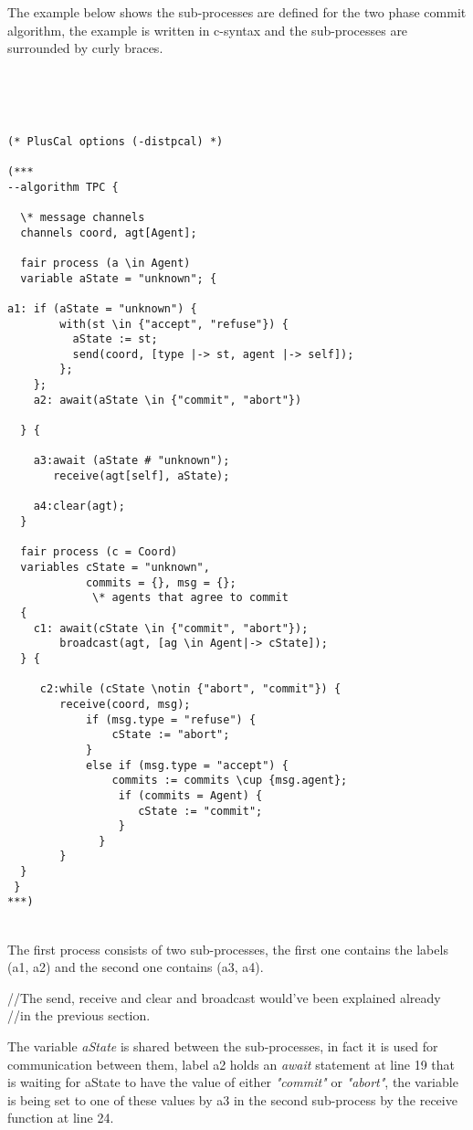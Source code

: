 \documentclass{thesul}
\begin{document}
The example below shows the sub-processes are defined for the two phase commit algorithm, the example is written in c-syntax and the sub-processes are surrounded by curly braces.

\hfill\\\hfill\\
\begin{lstlisting}[caption = Distributed PlusCal Sub-Processes, frame = tlrb, firstnumber = 1]
    
(* PlusCal options (-distpcal) *)

(***
--algorithm TPC {
 
  \* message channels
  channels coord, agt[Agent];
     
  fair process (a \in Agent)
  variable aState = "unknown"; {

a1: if (aState = "unknown") {
        with(st \in {"accept", "refuse"}) {
          aState := st;
          send(coord, [type |-> st, agent |-> self]);
        };
    };
    a2: await(aState \in {"commit", "abort"})
    
  } {
    
    a3:await (aState # "unknown");
       receive(agt[self], aState); 
       
    a4:clear(agt);
  }

  fair process (c = Coord) 
  variables cState = "unknown",
            commits = {}, msg = {};
             \* agents that agree to commit
  {
    c1: await(cState \in {"commit", "abort"});    
        broadcast(agt, [ag \in Agent|-> cState]);
  } {
        
     c2:while (cState \notin {"abort", "commit"}) {
        receive(coord, msg);
            if (msg.type = "refuse") {
                cState := "abort";
            }
            else if (msg.type = "accept") {
                commits := commits \cup {msg.agent};
                 if (commits = Agent) {
                    cState := "commit";
                 }
              }
        }
  }
 }
***)
\end{lstlisting}

\hfill\\

The first process consists of two sub-processes, the first one contains the labels (a1, a2) and the second one contains (a3, a4).

//The send, receive and clear and broadcast would've been explained already //in the previous section.

The variable \textit{aState} is shared between the sub-processes, in fact it is used for communication between them, label a2 holds an \textit{await} statement at line 19 that is waiting for aState to have the value of either \textit{"commit"} or \textit{"abort"}, the variable is being set to one of these values by a3 in the second sub-process by the receive function at line 24.
\end{document}
